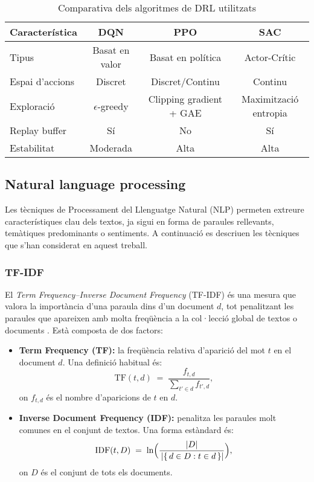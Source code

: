 \documentclass[12pt,a4paper,twoside]{book}
\begin{document}
\begin{table}[h]
\centering
\caption{Comparativa dels algoritmes de DRL utilitzats}
\begin{tabular}{lccc}
\hline
\textbf{Característica} & \textbf{DQN} & \textbf{PPO} & \textbf{SAC} \\ \hline
Tipus & Basat en valor & Basat en política & Actor-Crític \\
Espai d'accions & Discret & Discret/Continu & Continu \\
Exploració & $\epsilon$-greedy & Clipping gradient + GAE & Maximització entropia \\
Replay buffer & Sí & No & Sí \\
Estabilitat & Moderada & Alta & Alta \\ \hline
\end{tabular}
\label{tab:comparativa_algoritmes}
\end{table}



\subsection{Natural language processing}

 Les tècniques de Processament del Llenguatge Natural (NLP) permeten extreure característiques clau dels textos, ja sigui en forma de paraules rellevants, temàtiques predominants o sentiments. A continuació es descriuen les tècniques que s'han considerat en aquest treball.

\subsubsection{TF-IDF}

El \emph{Term Frequency–Inverse Document Frequency} (TF-IDF) és una mesura que valora la importància d'una paraula dins d'un document $d$, tot penalitzant les paraules que apareixen amb molta freqüència a la col·lecció global de textos o documents \cite{Ramos2003}. Està composta de dos factors:

\begin{itemize}
\item \textbf{Term Frequency (TF):} la freqüència relativa d'aparició del mot $t$ en el document $d$. Una definició habitual és:
\[
\mathrm{TF}(t,d) \;=\; \frac{f_{t,d}}{\sum_{t' \in d} f_{t',d}},
\]
on $f_{t,d}$ és el nombre d'aparicions de $t$ en $d$.
\item \textbf{Inverse Document Frequency (IDF):} penalitza les paraules molt comunes en el conjunt de textos. Una forma estàndard és:
\[
\mathrm{IDF}(t,D) \;=\; \ln \Bigl(\frac{|D|}{\,|\{\,d \in D : t \in d\,\}|}\Bigr),
\]
on $D$ és el conjunt de tots els documents.
\end{itemize}
\end{document}
